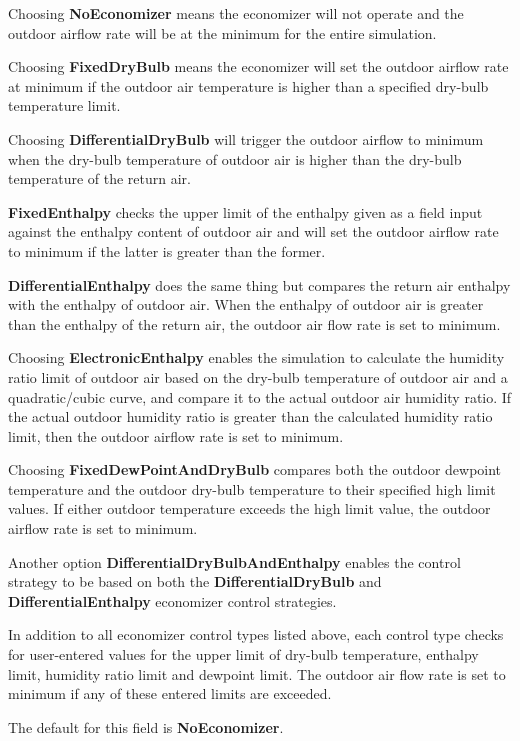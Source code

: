 Choosing \textbf{NoEconomizer} means the economizer will not operate and the outdoor airflow rate will be at the minimum for the entire simulation.

Choosing \textbf{FixedDryBulb} means the economizer will set the outdoor airflow rate at minimum if the outdoor air temperature is higher than a specified dry-bulb temperature limit.

Choosing \textbf{DifferentialDryBulb} will trigger the outdoor airflow to minimum when the dry-bulb temperature of outdoor air is higher than the dry-bulb temperature of the return air.

\textbf{FixedEnthalpy} checks the upper limit of the enthalpy given as a field input against the enthalpy content of outdoor air and will set the outdoor airflow rate to minimum if the latter is greater than the former.

\textbf{DifferentialEnthalpy} does the same thing but compares the return air enthalpy with the enthalpy of outdoor air. When the enthalpy of outdoor air is greater than the enthalpy of the return air, the outdoor air flow rate is set to minimum.

Choosing \textbf{ElectronicEnthalpy} enables the simulation to calculate the humidity ratio limit of outdoor air based on the dry-bulb temperature of outdoor air and a quadratic/cubic curve, and compare it to the actual outdoor air humidity ratio. If the actual outdoor humidity ratio is greater than the calculated humidity ratio limit, then the outdoor airflow rate is set to minimum.

Choosing \textbf{FixedDewPointAndDryBulb} compares both the outdoor dewpoint temperature and the outdoor dry-bulb temperature to their specified high limit values. If either outdoor temperature exceeds the high limit value, the outdoor airflow rate is set to minimum.

Another option \textbf{DifferentialDryBulbAndEnthalpy} enables the control strategy to be based on both the \textbf{DifferentialDryBulb} and \textbf{DifferentialEnthalpy} economizer control strategies.

In addition to all economizer control types listed above, each control type checks for user-entered values for the upper limit of dry-bulb temperature, enthalpy limit, humidity ratio limit and dewpoint limit. The outdoor air flow rate is set to minimum if any of these entered limits are exceeded.

The default for this field is \textbf{NoEconomizer}.

